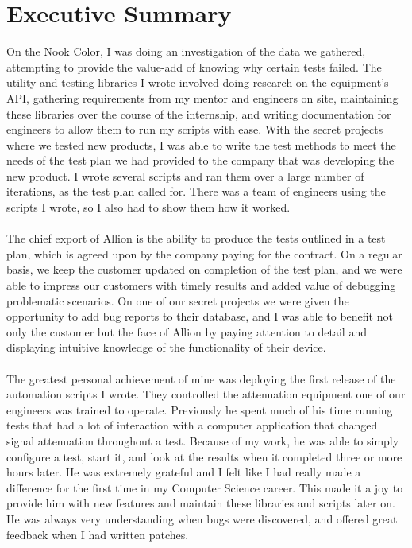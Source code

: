 \documentclass{article}
\begin{document}
\section*{Executive Summary}
On the Nook Color, I was doing an investigation of the data we gathered,
attempting to provide the value-add of knowing why certain tests failed.
The utility and testing libraries I wrote involved doing research on the
equipment's API, gathering requirements from my mentor and engineers on site,
maintaining these libraries over the course of the internship, and writing
documentation for engineers to allow them to run my scripts with ease.
With the secret projects where we tested new products, I was able to write the
test methods to meet the needs of the test plan we had provided to the company
that was developing the new product. I wrote several scripts and ran them over
a large number of iterations, as the test plan called for. There was a team of
engineers using the scripts I wrote, so I also had to show them how it worked.\\
\\
The chief export of Allion is the ability to produce the tests outlined in a
test plan, which is agreed upon by the company paying for the contract. On a
regular basis, we keep the customer updated on completion of the test plan, and
we were able to impress our customers with timely results and added value of
debugging problematic scenarios. On one of our secret projects we were given the
opportunity to add bug reports to their database, and I was able to benefit
not only the customer but the face of Allion by paying attention to detail and
displaying intuitive knowledge of the functionality of their device.\\
\\
The greatest personal achievement of mine was deploying the first release of the
automation scripts I wrote. They controlled the attenuation equipment one of our
engineers was trained to operate. Previously he spent much of his time running
tests that had a lot of interaction with a computer application that changed
signal attenuation throughout a test. Because of my work, he was able to simply
configure a test, start it, and look at the results when it completed three or
more hours later. He was extremely grateful and I
felt like I had really made a difference for the first time in my Computer
Science career. This made it a joy to provide him with new features and maintain
these libraries and scripts later on. He was always very understanding when bugs
were discovered, and offered great feedback when I had written patches.
\end{document}
